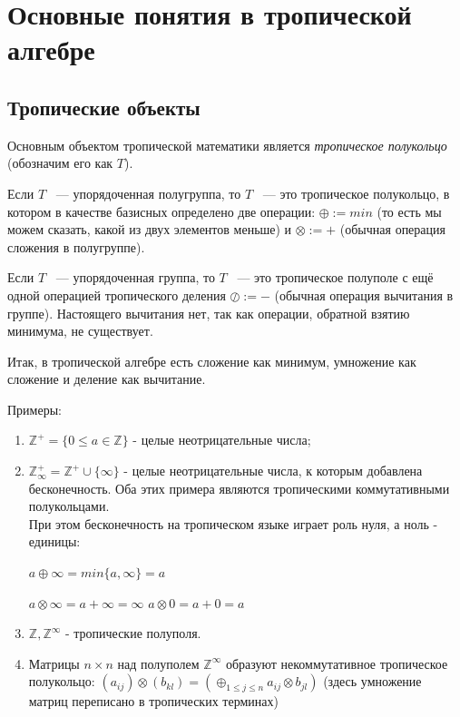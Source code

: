\documentclass[russian]{lecture-notes}
\begin{document}
\section{Основные понятия в тропической алгебре}

\subsection{Тропические объекты}

Основным объектом тропической математики является \emph{тропическое полукольцо}  (обозначим его как $T$).

Если $T$ ~---  упорядоченная полугруппа, то $T$ ~--- это тропическое полукольцо, в котором в качестве базисных определено две операции: $\oplus :=min$ (то есть мы можем сказать, какой из двух элементов меньше) и $ \otimes :=+ $ (обычная операция сложения в полугруппе).

Если $T$ ~--- упорядоченная группа, то $T$ ~--- это тропическое полуполе с ещё одной операцией тропического деления $\oslash:= - $ (обычная операция вычитания в группе). Настоящего вычитания нет, так как операции, обратной взятию минимума, не существует.

Итак, в тропической алгебре есть сложение как минимум, умножение как сложение и деление как вычитание.


Примеры:
\begin{enumerate}
	\item $\mathbb{Z}^+=\{0\le a \in \mathbb{Z}\}$ - целые неотрицательные числа;
	\item $\mathbb{Z}^+_\infty= \mathbb{Z}^+\cup \{\infty\}$ - целые неотрицательные числа, к которым добавлена бесконечность.
	Оба этих примера являются тропическими коммутативными полукольцами.
	\\
	
	При этом бесконечность на тропическом языке играет роль нуля, а ноль - единицы:
	
	$ a \oplus \infty=min\{a, \infty\}=a $
	
	$a \otimes \infty=a+\infty=\infty$
	$a \otimes 0=a+0=a$
	\item $\mathbb{Z}, \mathbb{Z}^\infty$ - тропические полуполя.
	\item Матрицы $n\times n$ над полуполем $\mathbb{Z}^\infty$ образуют некоммутативное тропическое полукольцо:
	$(a_{ij})\otimes (b_{kl})=(\oplus_{1\le j\le n}a_{ij}\otimes b_{jl})$ (здесь умножение матриц переписано в тропических терминах)
\end{enumerate}
\end{document}
